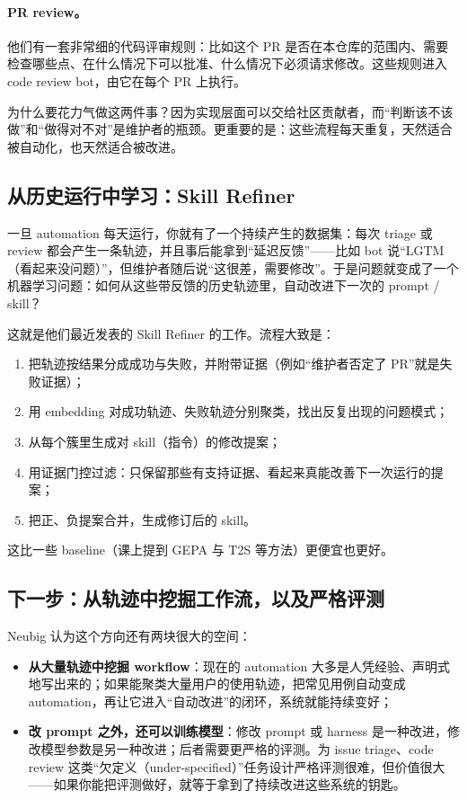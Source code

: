 \documentclass[a4paper]{article}
\begin{document}
\paragraph{PR review。}他们有一套非常细的代码评审规则：比如这个 PR 是否在本仓库的范围内、需要检查哪些点、在什么情况下可以批准、什么情况下必须请求修改。这些规则进入 code review bot，由它在每个 PR 上执行。

为什么要花力气做这两件事？因为实现层面可以交给社区贡献者，而“判断该不该做”和“做得对不对”是维护者的瓶颈。更重要的是：这些流程每天重复，天然适合被自动化，也天然适合被改进。

\subsection{从历史运行中学习：Skill Refiner}

一旦 automation 每天运行，你就有了一个持续产生的数据集：每次 triage 或 review 都会产生一条轨迹，并且事后能拿到“延迟反馈”——比如 bot 说“LGTM（看起来没问题）”，但维护者随后说“这很差，需要修改”。于是问题就变成了一个机器学习问题：如何从这些带反馈的历史轨迹里，自动改进下一次的 prompt / skill？

这就是他们最近发表的 Skill Refiner 的工作。流程大致是：

\begin{enumerate}
\item 把轨迹按结果分成成功与失败，并附带证据（例如“维护者否定了 PR”就是失败证据）；
\item 用 embedding 对成功轨迹、失败轨迹分别聚类，找出反复出现的问题模式；
\item 从每个簇里生成对 skill（指令）的修改提案；
\item 用证据门控过滤：只保留那些有支持证据、看起来真能改善下一次运行的提案；
\item 把正、负提案合并，生成修订后的 skill。
\end{enumerate}

这比一些 baseline（课上提到 GEPA 与 T2S 等方法）更便宜也更好。

\subsection{下一步：从轨迹中挖掘工作流，以及严格评测}

Neubig 认为这个方向还有两块很大的空间：

\begin{itemize}
\item \textbf{从大量轨迹中挖掘 workflow}：现在的 automation 大多是人凭经验、声明式地写出来的；如果能聚类大量用户的使用轨迹，把常见用例自动变成 automation，再让它进入“自动改进”的闭环，系统就能持续变好；
\item \textbf{改 prompt 之外，还可以训练模型}：修改 prompt 或 harness 是一种改进，修改模型参数是另一种改进；后者需要更严格的评测。为 issue triage、code review 这类“欠定义（under-specified）”任务设计严格评测很难，但价值很大——如果你能把评测做好，就等于拿到了持续改进这些系统的钥匙。
\end{itemize}
\end{document}
